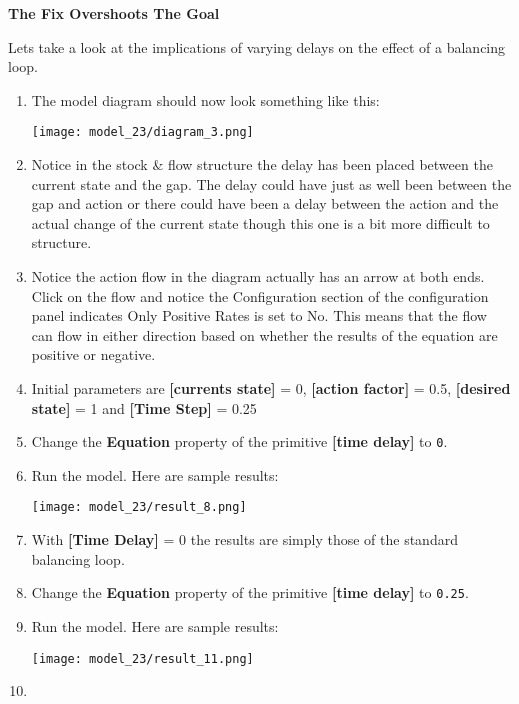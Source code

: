 \documentclass[]{memoir}
\makeatletter
\def\maxwidth{\ifdim\Gin@nat@width>\linewidth\linewidth
\else\Gin@nat@width\fi}
\let\Oldincludegraphics\includegraphics
\renewcommand{\includegraphics}[1]{\Oldincludegraphics[width=\maxwidth]{#1}}
\newcommand{\p}[1]{\textbf{{[}#1{]}}}
\newcommand{\e}[1]{\texttt{#1}}
\renewcommand{\a}[1]{\textbf{#1}}
\makeatother
\begin{document}
\begin{oframed}\textbf{The Fix Overshoots The Goal} 

 Lets take a look at the implications of varying delays on the effect of a balancing loop.

\begin{enumerate}
\item The model diagram should now look something like this: \par \begin{minipage}{\linewidth}  \centering \texttt{[image: model\_23/diagram\_3.png]}
\end{minipage}
\item 

Notice in the stock \& flow structure the delay has been placed between the current state and the gap. The delay could have just as well been between the gap and action or there could have been a delay between the action and the actual change of the current state though this one is a bit more difficult to structure.


\item 

Notice the action flow in the diagram actually has an arrow at both ends. Click on the flow and notice the Configuration section of the configuration panel indicates Only Positive Rates is set to No. This means that the flow can flow in either direction based on whether the results of the equation are positive or negative.


\item 

Initial parameters are \p{currents state} = 0, \p{action factor} = 0.5, \p{desired state} = 1 and \p{Time Step} = 0.25


\item  Change the \a{Equation} property of the primitive \p{time delay} to \e{0}.
\item Run the model. Here are sample results:\par \begin{minipage}{\linewidth}  \centering \texttt{[image: model\_23/result\_8.png]}
\end{minipage}
\item 

With \p{Time Delay} = 0 the results are simply those of the standard balancing loop.


\item  Change the \a{Equation} property of the primitive \p{time delay} to \e{0.25}.
\item Run the model. Here are sample results:\par \begin{minipage}{\linewidth}  \centering \texttt{[image: model\_23/result\_11.png]}
\end{minipage}
\item 


\end{enumerate}
\end{oframed}
\end{document}
